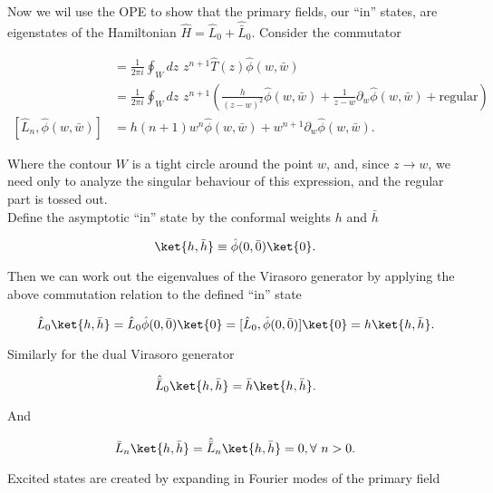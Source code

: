 \noindent Now we wil use the OPE to show that the primary fields, our ``in'' states, are eigenstates of the Hamiltonian $\hat{H} = \hat{L}_0 + \hat{\bar{L}}_0$. Consider the commutator

\begin{align}
[ \hat{L}_n, \hat{\phi} (w, \bar{w}) ] &= \frac{1}{2 \pi i} \oint_W dz \,\, z^{n+1} \hat{T} (z) \hat{\phi} (w, \bar{w}) \\
&= \frac{1}{2 \pi i} \oint_W dz \,\, z^{n+1} \left( \frac{h}{(z-w)^2} \hat{\phi} (w, \bar{w}) + \frac{1}{z-w} \partial_w \hat{\phi} (w, \bar{w}) + \text{regular} \right) \\
[ \hat{L}_n, \hat{\phi} (w, \bar{w}) ] &= h (n+1) w^n \hat{\phi} (w, \bar{w}) + w^{n+1} \partial_w \hat{\phi} (w, \bar{w}).
\end{align}

\noindent Where the contour $W$ is a tight circle around the point $w$, and, since $z \rightarrow w$, we need only to analyze the singular behaviour of this expression, and the regular part is tossed out. \\

\noindent Define the asymptotic ``in'' state by the conformal weights $h$ and $\bar{h}$

\begin{equation}
\ket{h,\bar{h}} \equiv \hat{\phi} (0,\bar{0}) \ket{0}.
\end{equation}

\noindent Then we can work out the eigenvalues of the Virasoro generator by applying the above commutation relation to the defined ``in'' state

\begin{equation}
\hat{L}_0 \ket{h,\bar{h}} = \hat{L}_0 \hat{\phi} (0,\bar{0}) \ket{0} = [\hat{L}_0, \hat{\phi} (0,\bar{0}) ] \ket{0} = h \ket{h, \bar{h}}.
\end{equation}

\noindent Similarly for the dual Virasoro generator

\begin{equation}
\hat{\bar{L}}_0 \ket{h, \bar{h}} = \bar{h} \ket{h, \bar{h}} .
\end{equation}

\noindent And

\begin{equation}
\bar{L}_n \ket{h, \bar{h}} = \hat{\bar{L}}_n \ket{h, \bar{h}} = 0, \forall \,\, n>0.
\end{equation}

\noindent Excited states are created by expanding in Fourier modes of the primary field

